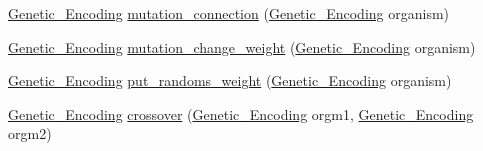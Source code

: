 \begin{DoxyCompactItemize}
\item 
\hyperlink{class_a_n_n___u_s_m_1_1_genetic___encoding}{Genetic\-\_\-\-Encoding} \hyperlink{class_a_n_n___u_s_m_1_1_population_acee4c5ba8e56deb1386864d349d78316}{mutation\-\_\-connection} (\hyperlink{class_a_n_n___u_s_m_1_1_genetic___encoding}{Genetic\-\_\-\-Encoding} organism)
\item 
\hyperlink{class_a_n_n___u_s_m_1_1_genetic___encoding}{Genetic\-\_\-\-Encoding} \hyperlink{class_a_n_n___u_s_m_1_1_population_aae7b2c347f1e8fbe0165e4d6f839a277}{mutation\-\_\-change\-\_\-weight} (\hyperlink{class_a_n_n___u_s_m_1_1_genetic___encoding}{Genetic\-\_\-\-Encoding} organism)
\item 
\hyperlink{class_a_n_n___u_s_m_1_1_genetic___encoding}{Genetic\-\_\-\-Encoding} \hyperlink{class_a_n_n___u_s_m_1_1_population_a0b858ba5af6628979fd7f136520cdd5b}{put\-\_\-randoms\-\_\-weight} (\hyperlink{class_a_n_n___u_s_m_1_1_genetic___encoding}{Genetic\-\_\-\-Encoding} organism)
\item 
\hyperlink{class_a_n_n___u_s_m_1_1_genetic___encoding}{Genetic\-\_\-\-Encoding} \hyperlink{class_a_n_n___u_s_m_1_1_population_a026d44aeb16651486c78dd8c8e0a293d}{crossover} (\hyperlink{class_a_n_n___u_s_m_1_1_genetic___encoding}{Genetic\-\_\-\-Encoding} orgm1, \hyperlink{class_a_n_n___u_s_m_1_1_genetic___encoding}{Genetic\-\_\-\-Encoding} orgm2)
\end{DoxyCompactItemize}
